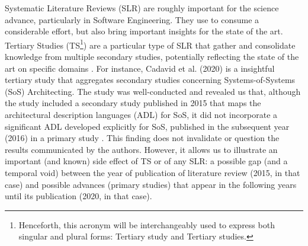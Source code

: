 \documentclass[sigconf]{acmart}
\begin{document}
Systematic Literature Reviews (SLR) are roughly important for the science advance, particularly in Software Engineering. They use to consume a considerable effort, but also bring important insights for the state of the art. Tertiary Studies (TS\footnote{Henceforth, this acronym will be interchangeably used to express both singular and plural forms: Tertiary study and Tertiary studies.}) are a particular type of SLR that gather and consolidate knowledge from multiple secondary studies, potentially reflecting the state of the art on specific domains \cite{Kudo20}. %
For instance, Cadavid et al. (2020) \cite{Cadavid2020} is a insightful tertiary study that aggregates secondary studies concerning Systems-of-Systems (SoS) Architecting. The study was well-conducted and revealed us that, although the study included a secondary study published in 2015 \cite{Guessi2015} that maps the architectural description languages (ADL) for SoS, it did not incorporate a significant ADL developed explicitly for SoS, published in the subsequent year (2016) in a primary study \cite{Oquendo2016}. This finding does not invalidate or question the results communicated by the authors. However, it allows us to illustrate an important (and known) side effect of TS or of any SLR: a possible gap (and a temporal void) between the year of publication of literature review (2015, in that case) and possible advances (primary studies) that appear in the following years until its publication (2020, in that case). %
\end{document}
